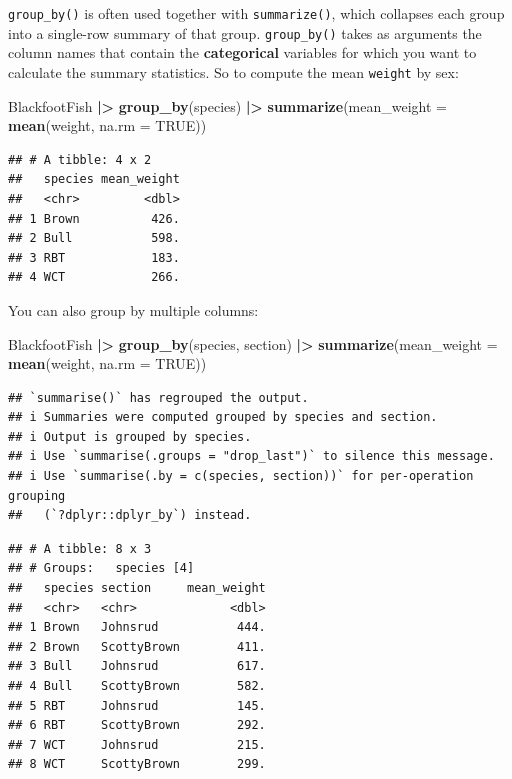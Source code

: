 \documentclass[
  10pt,
  letterpaper,
  twoside,
  openright]{book}
\newenvironment{Shaded}{\begin{snugshade}}{\end{snugshade}}
\newcommand{\AttributeTok}[1]{\textcolor[rgb]{0.13,0.29,0.53}{#1}}
\newcommand{\ConstantTok}[1]{\textcolor[rgb]{0.56,0.35,0.01}{#1}}
\newcommand{\FunctionTok}[1]{\textcolor[rgb]{0.13,0.29,0.53}{\textbf{#1}}}
\newcommand{\NormalTok}[1]{#1}
\newcommand{\SpecialCharTok}[1]{\textcolor[rgb]{0.81,0.36,0.00}{\textbf{#1}}}
\begin{document}
\texttt{group\_by()} is often used together with \texttt{summarize()},
which collapses each group into a single-row summary of that group.
\texttt{group\_by()} takes as arguments the column names that contain
the \textbf{categorical} variables for which you want to calculate the
summary statistics. So to compute the mean \texttt{weight} by sex:

\begin{Shaded}
\begin{Highlighting}[]
\NormalTok{BlackfootFish }\SpecialCharTok{|\textgreater{}}
  \FunctionTok{group\_by}\NormalTok{(species) }\SpecialCharTok{|\textgreater{}}
  \FunctionTok{summarize}\NormalTok{(}\AttributeTok{mean\_weight =} \FunctionTok{mean}\NormalTok{(weight, }\AttributeTok{na.rm =} \ConstantTok{TRUE}\NormalTok{))}
\end{Highlighting}
\end{Shaded}

\begin{verbatim}
## # A tibble: 4 x 2
##   species mean_weight
##   <chr>         <dbl>
## 1 Brown          426.
## 2 Bull           598.
## 3 RBT            183.
## 4 WCT            266.
\end{verbatim}

You can also group by multiple columns:

\begin{Shaded}
\begin{Highlighting}[]
\NormalTok{BlackfootFish }\SpecialCharTok{|\textgreater{}}
  \FunctionTok{group\_by}\NormalTok{(species, section) }\SpecialCharTok{|\textgreater{}}
  \FunctionTok{summarize}\NormalTok{(}\AttributeTok{mean\_weight =} \FunctionTok{mean}\NormalTok{(weight, }\AttributeTok{na.rm =} \ConstantTok{TRUE}\NormalTok{))}
\end{Highlighting}
\end{Shaded}

\begin{verbatim}
## `summarise()` has regrouped the output.
## i Summaries were computed grouped by species and section.
## i Output is grouped by species.
## i Use `summarise(.groups = "drop_last")` to silence this message.
## i Use `summarise(.by = c(species, section))` for per-operation grouping
##   (`?dplyr::dplyr_by`) instead.
\end{verbatim}

\begin{verbatim}
## # A tibble: 8 x 3
## # Groups:   species [4]
##   species section     mean_weight
##   <chr>   <chr>             <dbl>
## 1 Brown   Johnsrud           444.
## 2 Brown   ScottyBrown        411.
## 3 Bull    Johnsrud           617.
## 4 Bull    ScottyBrown        582.
## 5 RBT     Johnsrud           145.
## 6 RBT     ScottyBrown        292.
## 7 WCT     Johnsrud           215.
## 8 WCT     ScottyBrown        299.
\end{verbatim}
\end{document}
